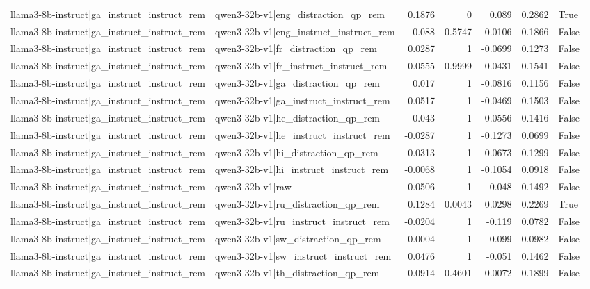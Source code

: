 \begin{table}
\begin{tabular}{l l r r r r l}
llama3-8b-instruct|ga_instruct_instruct_rem & qwen3-32b-v1|eng_distraction_qp_rem & 0.1876 & 0 & 0.089 & 0.2862 & True \\
llama3-8b-instruct|ga_instruct_instruct_rem & qwen3-32b-v1|eng_instruct_instruct_rem & 0.088 & 0.5747 & -0.0106 & 0.1866 & False \\
llama3-8b-instruct|ga_instruct_instruct_rem & qwen3-32b-v1|fr_distraction_qp_rem & 0.0287 & 1 & -0.0699 & 0.1273 & False \\
llama3-8b-instruct|ga_instruct_instruct_rem & qwen3-32b-v1|fr_instruct_instruct_rem & 0.0555 & 0.9999 & -0.0431 & 0.1541 & False \\
llama3-8b-instruct|ga_instruct_instruct_rem & qwen3-32b-v1|ga_distraction_qp_rem & 0.017 & 1 & -0.0816 & 0.1156 & False \\
llama3-8b-instruct|ga_instruct_instruct_rem & qwen3-32b-v1|ga_instruct_instruct_rem & 0.0517 & 1 & -0.0469 & 0.1503 & False \\
llama3-8b-instruct|ga_instruct_instruct_rem & qwen3-32b-v1|he_distraction_qp_rem & 0.043 & 1 & -0.0556 & 0.1416 & False \\
llama3-8b-instruct|ga_instruct_instruct_rem & qwen3-32b-v1|he_instruct_instruct_rem & -0.0287 & 1 & -0.1273 & 0.0699 & False \\
llama3-8b-instruct|ga_instruct_instruct_rem & qwen3-32b-v1|hi_distraction_qp_rem & 0.0313 & 1 & -0.0673 & 0.1299 & False \\
llama3-8b-instruct|ga_instruct_instruct_rem & qwen3-32b-v1|hi_instruct_instruct_rem & -0.0068 & 1 & -0.1054 & 0.0918 & False \\
llama3-8b-instruct|ga_instruct_instruct_rem & qwen3-32b-v1|raw & 0.0506 & 1 & -0.048 & 0.1492 & False \\
llama3-8b-instruct|ga_instruct_instruct_rem & qwen3-32b-v1|ru_distraction_qp_rem & 0.1284 & 0.0043 & 0.0298 & 0.2269 & True \\
llama3-8b-instruct|ga_instruct_instruct_rem & qwen3-32b-v1|ru_instruct_instruct_rem & -0.0204 & 1 & -0.119 & 0.0782 & False \\
llama3-8b-instruct|ga_instruct_instruct_rem & qwen3-32b-v1|sw_distraction_qp_rem & -0.0004 & 1 & -0.099 & 0.0982 & False \\
llama3-8b-instruct|ga_instruct_instruct_rem & qwen3-32b-v1|sw_instruct_instruct_rem & 0.0476 & 1 & -0.051 & 0.1462 & False \\
llama3-8b-instruct|ga_instruct_instruct_rem & qwen3-32b-v1|th_distraction_qp_rem & 0.0914 & 0.4601 & -0.0072 & 0.1899 & False \\

\end{tabular}
\end{table}
